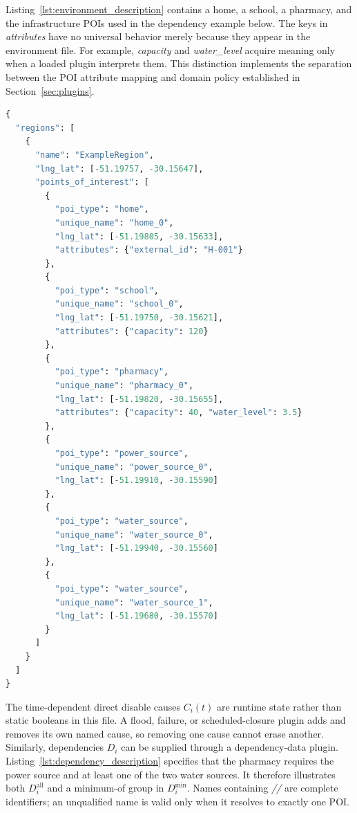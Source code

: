 Listing~\ref{lst:environment_description} contains a home, a school, a
pharmacy, and the infrastructure POIs used in the dependency example below.
The keys in \textit{attributes} have no universal behavior merely because they
appear in the environment file. For example, \textit{capacity} and
\textit{water\_level} acquire meaning only when a loaded plugin interprets
them. This distinction implements the separation between the POI attribute
mapping and domain policy established in Section~\ref{sec:plugins}.

\begin{lstlisting}[language={Python},
caption={Example of an environment input file with typed POIs and attributes.},
captionpos=b, label={lst:environment_description}, basicstyle=\scriptsize]
{
  "regions": [
    {
      "name": "ExampleRegion",
      "lng_lat": [-51.19757, -30.15647],
      "points_of_interest": [
        {
          "poi_type": "home",
          "unique_name": "home_0",
          "lng_lat": [-51.19805, -30.15633],
          "attributes": {"external_id": "H-001"}
        },
        {
          "poi_type": "school",
          "unique_name": "school_0",
          "lng_lat": [-51.19750, -30.15621],
          "attributes": {"capacity": 120}
        },
        {
          "poi_type": "pharmacy",
          "unique_name": "pharmacy_0",
          "lng_lat": [-51.19820, -30.15655],
          "attributes": {"capacity": 40, "water_level": 3.5}
        },
        {
          "poi_type": "power_source",
          "unique_name": "power_source_0",
          "lng_lat": [-51.19910, -30.15590]
        },
        {
          "poi_type": "water_source",
          "unique_name": "water_source_0",
          "lng_lat": [-51.19940, -30.15560]
        },
        {
          "poi_type": "water_source",
          "unique_name": "water_source_1",
          "lng_lat": [-51.19680, -30.15570]
        }
      ]
    }
  ]
}
\end{lstlisting}

The time-dependent direct disable causes $C_i(t)$ are runtime state rather than
static booleans in this file. A flood, failure, or scheduled-closure plugin adds
and removes its own named cause, so removing one cause cannot erase another.
Similarly, dependencies $D_i$ can be supplied through a dependency-data plugin.
Listing~\ref{lst:dependency_description} specifies that the pharmacy requires
the power source and at least one of the two water sources. It therefore
illustrates both $D_i^{\mathrm{all}}$ and a minimum-of group in
$D_i^{\mathrm{min}}$. Names containing \textit{//} are complete identifiers;
an unqualified name is valid only when it resolves to exactly one POI.

